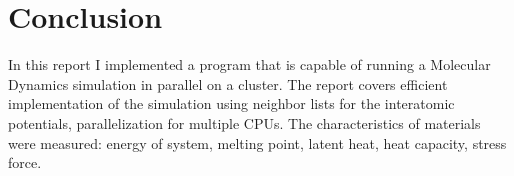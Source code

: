 \documentclass[12pt,a4paper]{article}
\begin{document}
\clearpage
\section{Conclusion}
\label{conclusion}

In this report I implemented a program that is capable of running a Molecular Dynamics simulation in parallel on a cluster. The report covers efficient implementation of the simulation using neighbor lists for the interatomic potentials, parallelization for multiple CPUs. The characteristics of materials were measured: energy of system, melting point, latent heat, heat capacity, stress force.

\newpage
{\small
	
	
}
\end{document}

